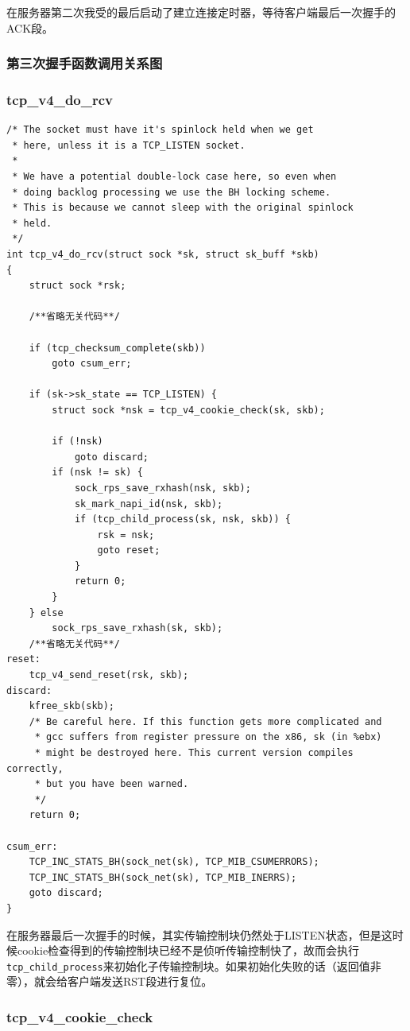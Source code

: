                 在服务器第二次我受的最后启动了建立连接定时器，等待客户端最后一次握手的ACK段。           
                \subsubsection{第三次握手函数调用关系图}
                \subsubsection{tcp\_v4\_do\_rcv}
\begin{verbatim}
/* The socket must have it's spinlock held when we get
 * here, unless it is a TCP_LISTEN socket.
 *
 * We have a potential double-lock case here, so even when
 * doing backlog processing we use the BH locking scheme.
 * This is because we cannot sleep with the original spinlock
 * held.
 */
int tcp_v4_do_rcv(struct sock *sk, struct sk_buff *skb)
{
    struct sock *rsk;

    /**省略无关代码**/

    if (tcp_checksum_complete(skb))
        goto csum_err;

    if (sk->sk_state == TCP_LISTEN) {
        struct sock *nsk = tcp_v4_cookie_check(sk, skb);

        if (!nsk)
            goto discard;
        if (nsk != sk) {
            sock_rps_save_rxhash(nsk, skb);
            sk_mark_napi_id(nsk, skb);
            if (tcp_child_process(sk, nsk, skb)) {
                rsk = nsk;
                goto reset;
            }
            return 0;
        }
    } else
        sock_rps_save_rxhash(sk, skb);
    /**省略无关代码**/
reset:
    tcp_v4_send_reset(rsk, skb);
discard:
    kfree_skb(skb);
    /* Be careful here. If this function gets more complicated and
     * gcc suffers from register pressure on the x86, sk (in %ebx)
     * might be destroyed here. This current version compiles correctly,
     * but you have been warned.
     */
    return 0;

csum_err:
    TCP_INC_STATS_BH(sock_net(sk), TCP_MIB_CSUMERRORS);
    TCP_INC_STATS_BH(sock_net(sk), TCP_MIB_INERRS);
    goto discard;
}
\end{verbatim}
                    在服务器最后一次握手的时候，其实传输控制块仍然处于LISTEN状态，但是这时候cookie检查得到的传输控制块已经不是侦听传输控制快了，故而会执行\texttt{tcp_child_process}来初始化子传输控制块。如果初始化失败的话（返回值非零），就会给客户端发送RST段进行复位。

                \subsubsection{tcp\_v4\_cookie\_check}

